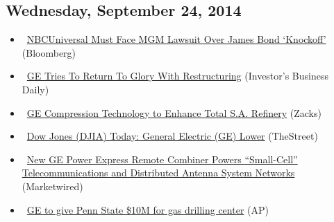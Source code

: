 \documentclass[11pt,asymmetric]{article}
\begin{document}
\subsection*{Wednesday, September 24, 2014}
\begin{itemize}
\item\ \href{http://www.bloomberg.com/news/2014-09-25/nbcuniversal-must-face-mgm-lawsuit-over-james-bond-knockoff-.html?cmpid=yhoo}{NBCUniversal Must Face MGM Lawsuit Over James Bond ‘Knockoff’} (Bloomberg)
\item\ \href{http://news.investors.com/092414-718804-general-electric-restructuring.htm?ven=yahoocp&src=aurlled&ven=yahoo}{GE Tries To Return To Glory With Restructuring} (Investor's Business Daily)
\item\ \href{http://finance.yahoo.com/news/ge-compression-technology-enhance-total-150516280.html}{GE Compression Technology to Enhance Total S.A. Refinery} (Zacks)
\item\ \href{http://www.thestreet.com/story/12890921/1/dow-jones-djia-today-general-electric-ge-lower.html?puc=yahoo&cm_ven=YAHOO}{Dow Jones (DJIA) Today: General Electric (GE) Lower} (TheStreet)
\item\ \href{http://finance.yahoo.com/news/ge-power-express-remote-combiner-133000787.html}{New GE Power Express Remote Combiner Powers ``Small-Cell'' Telecommunications and Distributed Antenna System Networks} (Marketwired)
\item\ \href{http://finance.yahoo.com/news/ge-penn-state-10m-gas-drilling-center-114630191--finance.html}{GE to give Penn State \$10M for gas drilling center} (AP)
\end{itemize}
\end{document}
